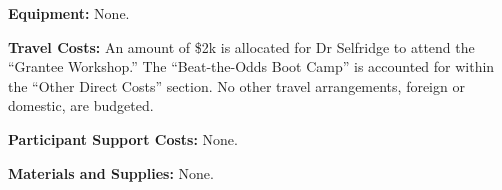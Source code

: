 \documentclass[11pt]{article}
\begin{document}
{\bf Equipment:} None.


{\bf Travel Costs:} An amount of \$2k is allocated for Dr Selfridge to attend the ``Grantee Workshop.''  The ``Beat-the-Odds Boot Camp'' is accounted for within the ``Other Direct Costs'' section.  No other travel arrangements, foreign or domestic, are budgeted.


{\bf Participant Support Costs:} None.


{\bf Materials and Supplies:} None.
\end{document}
